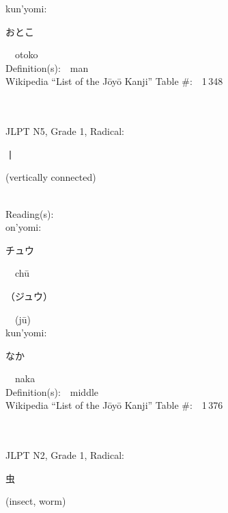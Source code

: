 \begin{multicols}{2}
{\hspace*{1em}}kun'yomi:\ \ \\
{\hspace*{2em}}{\begin{CJK}{UTF8}{min} おとこ \end{CJK}}\ \ otoko\ \ \\
Definition(s):\ \ man \\
Wikipedia ``List of the J\=oy\=o Kanji'' Table \#:\ \ 1\,348 \\
\ \ \\
{\fontsize{34pt}{40pt}  }\ \ \\  %
{JLPT N5, Grade 1, Radical:\ \ {\begin{CJK}{UTF8}{min} 丨 \end{CJK}} (vertically connected) } \\
Reading(s):\ \ \\
{\hspace*{1em}}on'yomi:\ \ \\
{\hspace*{2em}}{\begin{CJK}{UTF8}{min} チュウ \end{CJK}}\ \ ch\=u\ \ \\
{\hspace*{2em}}{\begin{CJK}{UTF8}{min} （ジュウ） \end{CJK}}\ \ (j\=u)\ \ \\
{\hspace*{1em}}kun'yomi:\ \ \\
{\hspace*{2em}}{\begin{CJK}{UTF8}{min} なか \end{CJK}}\ \ naka\ \ \\
Definition(s):\ \ middle \\
Wikipedia ``List of the J\=oy\=o Kanji'' Table \#:\ \ 1\,376 \\
\ \ \\
{\fontsize{34pt}{40pt}  }\ \ \\  %
{JLPT N2, Grade 1, Radical:\ \ {\begin{CJK}{UTF8}{min} 虫 \end{CJK}} (insect, worm) } \\

\end{multicols}
